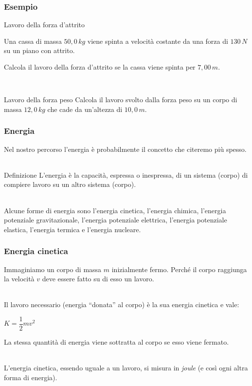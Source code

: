 \documentclass[]{beamer}
\theoremstyle{plain}
\begin{document}
\begin{frame}
\frametitle{Esempio}
\begin{exampleblock}{Lavoro della forza d'attrito}
{\small Una cassa di massa $ 50,0 \, kg $ viene spinta a velocità costante da una forza di $ 130 \, N $ su un piano con attrito.

Calcola il lavoro della forza d'attrito se la cassa viene spinta per $ 7,00 \, m $.}
\end{exampleblock}

~

\begin{exampleblock}{Lavoro della forza peso}
{\small Calcola il lavoro svolto dalla forza peso su un corpo di massa $ 12,0 \, kg $ che cade da un'altezza di $ 10,0 \, m $.}
\end{exampleblock}
\end{frame}




\begin{frame}
  \frametitle{Energia}
Nel nostro percorso l'energia è probabilmente il concetto che citeremo più spesso.\\~\pause
\begin{block}{Definizione}
  L'energia è la capacità, espressa o inespressa, di un sistema (corpo) di compiere lavoro su un altro sistema (corpo).
\end{block}~\pause\\
Alcune forme di energia sono l'energia cinetica, l'energia chimica, l'energia potenziale gravitazionale, l'energia potenziale elettrica, l'energia potenziale elastica, l'energia termica e l'energia nucleare.
\end{frame}


\begin{frame}
\frametitle{Energia cinetica}
Immaginiamo un corpo di massa $ m $ inizialmente fermo. Perché il corpo raggiunga la velocità $ v $ deve essere fatto su di esso un lavoro.\\~\pause

Il lavoro necessario (energia ``donata'' al corpo) è la sua \alert{energia cinetica} e vale:
\begin{center}
\colorbox{blue!30}{$ K = \dfrac{1}{2}mv^2 $}
\end{center}
La stessa quantità di energia viene sottratta al corpo se esso viene fermato.\\~\pause

L'energia cinetica, essendo uguale a un lavoro, si misura in \emph{joule} (e così ogni altra forma di energia).
\end{frame}
\end{document}
